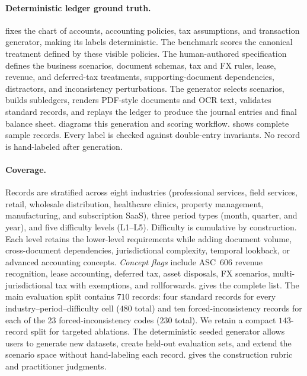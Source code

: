 \paragraph{Deterministic ledger ground truth.}
\benchmark{} fixes the chart of accounts, accounting policies, tax assumptions, and transaction generator, making its labels deterministic. The benchmark scores the canonical treatment defined by these visible policies. The human-authored specification defines the business scenarios, document schemas, tax and FX rules, lease, revenue, and deferred-tax treatments, supporting-document dependencies, distractors, and inconsistency perturbations. The generator selects scenarios, builds subledgers, renders PDF-style documents and OCR text, validates standard records, and replays the ledger to produce the journal entries and final balance sheet.  diagrams this generation and scoring workflow.  shows complete sample records. Every label is checked against double-entry invariants. No record is hand-labeled after generation.

\paragraph{Coverage.}
Records are stratified across eight industries (professional services, field services, retail, wholesale distribution, healthcare clinics, property management, manufacturing, and subscription SaaS), three period types (month, quarter, and year), and five difficulty levels (L1--L5). Difficulty is cumulative by construction. Each level retains the lower-level requirements while adding document volume, cross-document dependencies, jurisdictional complexity, temporal lookback, or advanced accounting concepts. \emph{Concept flags} include ASC~606 revenue recognition, lease accounting, deferred tax, asset disposals, FX scenarios, multi-jurisdictional tax with exemptions, and rollforwards.  gives the complete list. The main evaluation split contains $710$ records: four standard records for every industry--period--difficulty cell ($480$ total) and ten forced-inconsistency records for each of the 23 forced-inconsistency codes ($230$ total). We retain a compact $143$-record split for targeted ablations. The deterministic seeded generator allows users to generate new datasets, create held-out evaluation sets, and extend the scenario space without hand-labeling each record.  gives the construction rubric and practitioner judgments.


